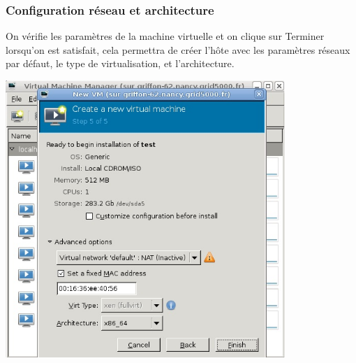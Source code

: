 \subsubsection{ Configuration réseau et architecture}
On vérifie les paramètres de la machine virtuelle et on clique sur Terminer lorsqu'on est satisfait, cela permettra de créer l'hôte avec les paramètres réseaux par défaut, le type de virtualisation, et l'architecture.
\begin{center}
\includegraphics[width=300pt]{images/reseau.jpg}
\end{center}


